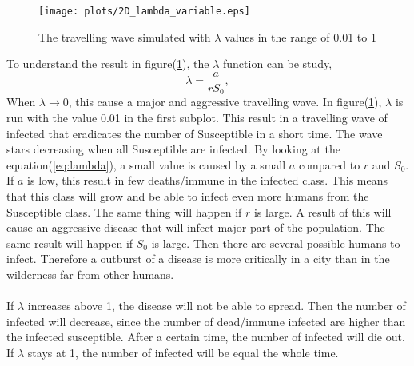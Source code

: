 \documentclass[%
twoside,                 %
final,                   %
10pt]{article}
\begin{document}
\begin{figure}[ht]
  \centerline{\texttt{[image: plots/2D\_lambda\_variable.eps]}}
  \caption{
  \label{fig:change_lambda} The travelling wave simulated with $\lambda$ values in the range of 0.01 to 1
  }
\end{figure}


To understand the result in figure(\ref{fig:change_lambda}), the $\lambda $ function can be study,
\begin{equation} \label{eq:lambda}
 \lambda =\frac{a}{rS_0},
\end{equation}
When $\lambda \rightarrow 0$, this cause a major and aggressive travelling wave. In figure(\ref{fig:change_lambda}), $\lambda$ is run with the value 0.01 in the first subplot. This result in a travelling wave of infected that eradicates the number of Susceptible in a short time. The wave stars decreasing when all Susceptible are infected. By looking at the equation(\ref{eq:lambda}), a small value is caused by a small $a$ compared to $r$ and $S_0$. If $a$ is low, this result in few deaths/immune in the infected class. This means that this class will grow and be able to infect even more humans from the Susceptible class. The same thing will happen if $r$ is large. A result of this will cause an aggressive disease that will infect major part of the population. The same result will happen if $S_0$ is large. Then there are several possible humans to infect. Therefore a outburst of a disease is more critically in a city than in the wilderness far from other humans.
\\
\\
If $\lambda$ increases above 1, the disease will not be able to spread. Then the number of infected will decrease, since the number of dead/immune infected are higher than the infected susceptible. After a certain time, the number of infected will die out. If $\lambda$ stays at 1, the number of infected will be equal the whole time. 
\end{document}
